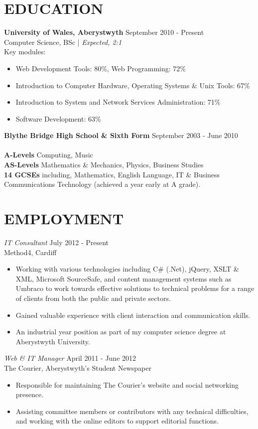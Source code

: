 \documentclass[line,margin]{res}
\begin{document}
\begin{resume}
\section{EDUCATION} {\bf University of Wales, Aberystwyth} \hfill September 2010 - Present\\
               Computer Science, BSc | {\sl Expected, 2:1}\\
Key modules: 
\begin{itemize} \itemsep -2pt
\item Web Development Tools: 80\%, Web Programming: 72\%
\item Introduction to Computer Hardware, Operating Systems \& Unix Tools: 67\%
\item Introduction to System and Network Services Administration: 71\%
\item Software Development: 63\%\\
\end{itemize}
{\bf Blythe Bridge High School \& Sixth Form} \hfill September 2003 - June 2010 \\ \\
{\bf A-Levels} Computing, Music\\
{\bf AS-Levels} Mathematics \& Mechanics, Physics, Business Studies\\
{\bf 14 GCSEs} including, Mathematics, English Language, IT \& Business Communications Technology (achieved a year early at A grade).

\newpage
\section{EMPLOYMENT}
	{\sl IT Consultant} \hfill July 2012 - Present \\
	Method4, Cardiff
	\begin{itemize} \itemsep -2pt
		\item Working with various technologies including C\# (.Net), jQuery, XSLT \& XML, Microsoft SourceSafe, and content management systems such as Umbraco to work towards effective solutions to technical problems for a range of clients from both the public and private sectors.
		\item Gained valuable experience with client interaction and communication skills.
		\item An industrial year position as part of my computer science degree at Aberystwyth University.
	\end{itemize}

	{\sl Web \& IT Manager} \hfill April 2011 - June 2012 \\
	The Courier, Aberystwyth's Student Newspaper
	\begin{itemize} \itemsep -2pt
	\item Responsible for maintaining The Courier's website and social networking presence.
	\item Assisting committee members or contributors with any technical difficulties, and working with the online editors to support editorial functions.
	\end{itemize}


\end{resume}
\end{document}
